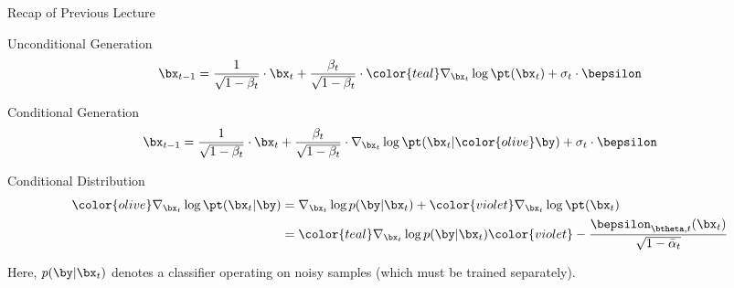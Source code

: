 \documentclass{beamer}
\begin{document}
\begin{frame}{Recap of Previous Lecture}
	\begin{block}{Unconditional Generation}
		\vspace{-0.3cm}
		\[
			\bx_{t - 1} = \frac{1}{\sqrt{1 - \beta_t}} \cdot \bx_t + \frac{\beta_t}{\sqrt{1 - \beta_t}} \cdot {\color{teal} \nabla_{\bx_t} \log \pt(\bx_t)} +  \sigma_t \cdot \bepsilon
		\]
		\vspace{-0.5cm}
	\end{block}
	\begin{block}{Conditional Generation}
		\vspace{-0.5cm}
		\[
			\bx_{t - 1} =  \frac{1}{\sqrt{1 - \beta_t}}\cdot \bx_t +  \frac{\beta_t}{\sqrt{1 - \beta_t}}  \cdot  \nabla_{\bx_t} \log \pt(\bx_t | {\color{olive}\by}) +  \sigma_t \cdot \bepsilon
		\]
		\vspace{-0.5cm}
	\end{block}
	\begin{block}{Conditional Distribution}
		\vspace{-0.5cm}
		\begin{align*}
			{\color{olive}\nabla_{\bx_t} \log \pt(\bx_t | \by)} &= \nabla_{\bx_t} \log p(\by | \bx_t) + {\color{violet}\nabla_{\bx_t} \log \pt(\bx_t)}\\
			&= {\color{teal}\nabla_{\bx_t} \log p(\by | \bx_t)} {\color{violet}- \frac{\bepsilon_{\btheta, t}(\bx_t)}{\sqrt{1 - \bar{\alpha}_t}}}
		\end{align*}
		\vspace{-0.5cm}
	\end{block}
	Here, $p(\by | \bx_t)$ denotes a classifier operating on noisy samples (which must be trained separately).
\end{frame}
\end{document}
